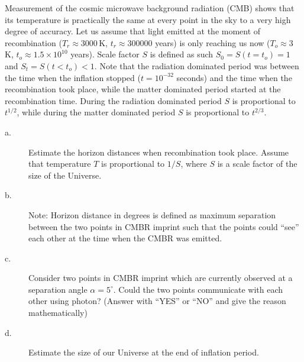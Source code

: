 Measurement of the cosmic microwave background radiation (CMB) shows that its
temperature is practically the same at every point in the sky to a very high
degree of accuracy. Let us assume that light emitted at the moment of
recombination ($T_r \approx 3000$\,K, $t_r \approx 300000$ years) is only
reaching us now ($T_o \approx 3$\,K, $t_o \approx 1.5 \times 10^{10}$ years).
Scale factor $S$ is defined as such $S_0 = S(t = t_o) = 1$ and
$S_t = S(t < t_o) < 1$. Note that the radiation dominated period was between
the time when the inflation stopped ($t = 10^{-32}$ seconds) and the time when
the recombination took place, while the matter dominated period started at the
recombination time. During the radiation dominated period $S$ is proportional
to $t^{1/2}$, while during the matter dominated period $S$ is proportional to
$t^{2/3}$.

\begin{description}
\item[a.] Estimate the horizon distances when recombination took place. Assume
  that temperature $T$ is proportional to $1/S$, where $S$ is a scale factor
  of the size of the Universe.
\item[b.] Note: Horizon distance in degrees is defined as maximum separation
  between the two points in CMBR imprint such that the points could ``see''
  each other at the time when the CMBR was emitted.
\item[c.] Consider two points in CMBR imprint which are currently observed at
  a separation angle $\alpha = 5^\circ$. Could the two points communicate with
  each other using photon? (Answer with ``YES'' or ``NO'' and give the reason
  mathematically)
\item[d.] Estimate the size of our Universe at the end of inflation period.
\end{description}
